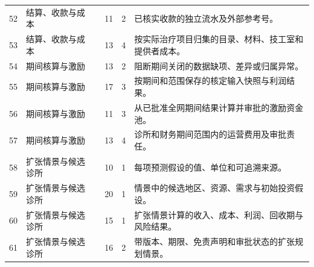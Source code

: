 \begin{longtable}{@{}C{8mm}L{27mm}L{42mm}C{10mm}C{10mm}L{49mm}@{}}
52 & 结算、收款与成本 &  & 11 & 2 & 已核实收款的独立流水及外部参考号。 \\
53 & 结算、收款与成本 &  & 13 & 4 & 按实际治疗项目归集的目录、材料、技工室和提供者成本。 \\
54 & 期间核算与激励 &  & 13 & 2 & 阻断期间关闭的数据缺项、差异或归属异常。 \\
55 & 期间核算与激励 &  & 17 & 3 & 按期间和范围保存的核定输入快照与利润结果。 \\
56 & 期间核算与激励 &  & 11 & 3 & 从已批准全网期间结果计算并审批的激励资金池。 \\
57 & 期间核算与激励 &  & 13 & 4 & 诊所和财务期间范围内的运营费用及审批责任。 \\
58 & 扩张情景与候选诊所 &  & 10 & 1 & 每项预测假设的值、单位和可追溯来源。 \\
59 & 扩张情景与候选诊所 &  & 20 & 1 & 情景中的候选地区、资源、需求与初始投资假设。 \\
60 & 扩张情景与候选诊所 &  & 15 & 1 & 扩张情景计算的收入、成本、利润、回收期与风险结果。 \\
61 & 扩张情景与候选诊所 &  & 16 & 2 & 带版本、期限、免责声明和审批状态的扩张规划情景。 \\
\bottomrule\end{longtable}
\endgroup

